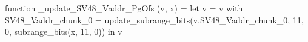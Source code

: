 function _update_SV48_Vaddr_PgOfs (v, x) = let v = { v with SV48_Vaddr_chunk_0 = update_subrange_bits(v.SV48_Vaddr_chunk_0, 11, 0, subrange_bits(x, 11, 0)) } in
  v
